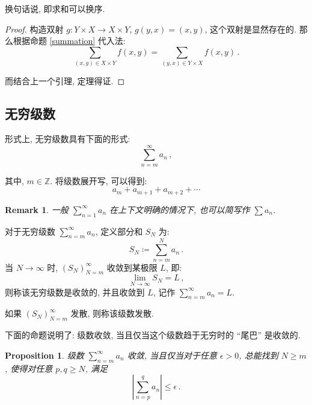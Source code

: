 \documentclass[UTF8]{ctexart}
\theoremstyle{mystyle}
\newtheorem{proposition}{Proposition}[section]
\theoremstyle{myremark}
\newtheorem*{remark}{Remark}
\theoremstyle{plain}
\newcommand{\Z}{\mathbb Z}
\begin{document}
换句话说, 即求和可以换序.

\begin{proof}
    构造双射 $ g \colon Y \times X \to X \times Y $, $ g(y, x) = (x, y) $, 这个双射是显然存在的. 那么根据命题 \ref{summation} 代入法: \[ \sum_{(x, y) \in X \times Y} f(x, y) = \sum_{(y, x) \in Y \times X} f(x, y) \,.\]

    而结合上一个引理, 定理得证.
\end{proof}


\subsection{无穷级数}
形式上, 无穷级数具有下面的形式: \[ \sum_{n = m}^\infty a_n \,,\]

其中, $ m \in \Z $. 将级数展开写, 可以得到: \[ a_m + a_{m +    1} + a_{m + 2} + \cdots \]

\begin{remark}
    一般 $ \displaystyle \sum_{n = 1}^\infty a_n $ 在上下文明确的情况下, 也可以简写作 $ \sum a_n $.
\end{remark}

\begin{definition}
    对于无穷级数 $ \displaystyle \sum_{n = m}^\infty a_n $, 定义部分和 $ S_N $ 为: \[ S_N \coloneqq \sum_{n = m}^N a_n \,.\] 当 $ N \to \infty $ 时, $ (S_N)_{N = m}^\infty $ 收敛到某极限 $ L $, 即: \[ \lim_{N \to \infty} S_N = L \,,\] 则称该无穷级数是收敛的, 并且收敛到 $ L $, 记作 $ \displaystyle \sum_{n = m}^\infty a_n = L $. 
    
    如果 $ (S_N)_{N = m}^\infty $ 发散, 则称该级数发散.
\end{definition}

下面的命题说明了: 级数收敛, 当且仅当这个级数趋于无穷时的 ``尾巴'' 是收敛的.

\begin{proposition} \label{tail}
    级数 $ \displaystyle \sum_{n = m}^\infty a_n $ 收敛, 当且仅当对于任意 $ \epsilon > 0 $, 总能找到 $ N \geqslant m $, 使得对任意 $ p, q \geqslant N $, 满足 \[ \left| \sum_{n = p}^q a_n \right| \leqslant \epsilon \,.\]
\end{proposition}
\end{document}

